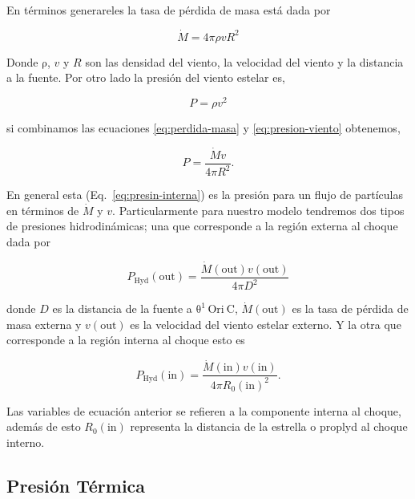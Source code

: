 \documentclass{article}
\newcommand\thC{\ensuremath{\mathrm{\theta^1\,Ori~C}}}
\newcommand\Out{\ensuremath{\mathrm{out}}}
\newcommand\In{\ensuremath{\mathrm{in}}}
\begin{document}
 En términos generareles la tasa de pérdida de masa está dada por

\begin{equation}
  \label{eq:perdida-masa}
  \dot{M}=4\pi \rho v R^{2}
\end{equation}

Donde \(\mathrm{\rho}\), \(v\) y \(R\) son las densidad del viento, la velocidad del viento y la distancia a la fuente. Por otro lado la presión del viento estelar es,

\begin{equation}
  \label{eq:presion-viento}
  P=\rho v^{2}
\end{equation}

si combinamos las ecuaciones \ref{eq:perdida-masa} y \ref{eq:presion-viento} obtenemos,

\begin{equation}
  \label{eq:presin-interna}
  P=\frac{\dot{M} v}{4 \pi R^{2}}. 
\end{equation}
 
En general esta (Eq.~\ref{eq:presin-interna}) es la presión para un flujo de partículas en términos de \(\dot{M}\) y \(v\). Particularmente para nuestro modelo tendremos  dos tipos de presiones hidrodinámicas; una que corresponde a la región externa al choque dada por

\begin{equation}
  \label{eq:presin-interna}
   P_{\text{Hyd}}(\Out{})=\frac{\dot{M}(\Out{}) v(\Out)}{4 \pi D^{2}}
\end{equation}

donde \(D\) es la distancia de la fuente a \thC{}, \(\dot{M}(\Out{})\) es la tasa de pérdida de masa externa y \(v(\Out{})\) es la velocidad del viento estelar externo. Y la otra que corresponde a la región interna al choque esto es

 
\begin{equation}
  \label{eq:presin-interna}
  P_{\text{Hyd}}(\In{})=\frac{\dot{M}(\In{}) v(\In)}{4 \pi R_{0}(\In{})^{2}}.
\end{equation}

Las variables de ecuación anterior se refieren a la componente interna al choque, además de esto \(R_{0}(\In{})\) representa la distancia de la estrella o proplyd al choque interno.

\subsection{Presión Térmica}
\label{sec:pressur-thermal}
\end{document}
